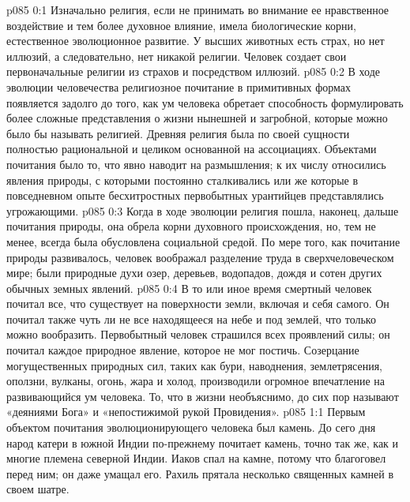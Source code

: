 \author{Блестящая Вечерняя Звезда}
\vs p085 0:1 Изначально религия, если не принимать во внимание ее нравственное воздействие и тем более духовное влияние, имела биологические корни, естественное эволюционное развитие. У высших животных есть страх, но нет иллюзий, а следовательно, нет никакой религии. Человек создает свои первоначальные религии из страхов и посредством иллюзий.
\vs p085 0:2 В ходе эволюции человечества религиозное почитание в примитивных формах появляется задолго до того, как ум человека обретает способность формулировать более сложные представления о жизни нынешней и загробной, которые можно было бы называть религией. Древняя религия была по своей сущности полностью рациональной и целиком основанной на ассоциациях. Объектами почитания было то, что явно наводит на размышления; к их числу относились явления природы, с которыми постоянно сталкивались или же которые в повседневном опыте бесхитростных первобытных урантийцев представлялись угрожающими.
\vs p085 0:3 Когда в ходе эволюции религия пошла, наконец, дальше почитания природы, она обрела корни духовного происхождения, но, тем не менее, всегда была обусловлена социальной средой. По мере того, как почитание природы развивалось, человек воображал разделение труда в сверхчеловеческом мире; были природные духи озер, деревьев, водопадов, дождя и сотен других обычных земных явлений.
\vs p085 0:4 В то или иное время смертный человек почитал все, что существует на поверхности земли, включая и себя самого. Он почитал также чуть ли не все находящееся на небе и под землей, что только можно вообразить. Первобытный человек страшился всех проявлений силы; он почитал каждое природное явление, которое не мог постичь. Созерцание могущественных природных сил, таких как бури, наводнения, землетрясения, оползни, вулканы, огонь, жара и холод, производили огромное впечатление на развивающийся ум человека. То, что в жизни необъяснимо, до сих пор называют «деяниями Бога» и «непостижимой рукой Провидения».
\vs p085 1:1 Первым объектом почитания эволюционирующего человека был камень. До сего дня народ катери в южной Индии по\hyp{}прежнему почитает камень, точно так же, как и многие племена северной Индии. Иаков спал на камне, потому что благоговел перед ним; он даже умащал его. Рахиль прятала несколько священных камней в своем шатре.
